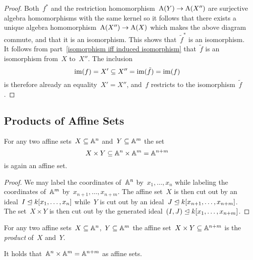 \begin{proof}
  Both~$f^*$ and the restriction homomorphism~$\operatorname{A}(Y) \to \operatorname{A}(X'')$ are surjective algebra homomorphisms with the same kernel so it follows that there exists a unique algebra homomorphism~$\operatorname{A}(X'') \to \operatorname{A}(X)$ which makes the above diagram commute, and that it is an isomorphism.
  This shows that~$\tilde{f}^*$ is an isomorphism.
  It follows from part~\ref*{isomorphism iff induced isomorphism} that~$\tilde{f}$ is an isomorphism from~$X$ to~$X''$.
  The inclusion
  \[
              \operatorname{im}(f)
    =         X'
    \subseteq X''
    =         \operatorname{im}(\tilde{f})
    =         \operatorname{im}(f)
  \]
  is therefore already an equality~$X' = X''$, and~$f$ restricts to the isomorphism~$\tilde{f}$.
\end{proof}





\subsection{Products of Affine Sets}


\begin{lemma}
  \label{product of affine sets is an affine set}
  For any two affine sets~$X \subseteq \mathbb{A}^n$ and~$Y \subseteq \mathbb{A}^m$ the set
  \[
              X \times Y
    \subseteq \mathbb{A}^n \times \mathbb{A}^m
    =         \mathbb{A}^{n+m}
  \]
  is again an affine set.
\end{lemma}


\begin{proof}
  We may label the coordinates of~$\mathbb{A}^n$ by~$x_1, \dotsc, x_n$ while labeling the coordinates of~$\mathbb{A}^m$ by~$x_{n+1}, \dotsc, x_{n+m}$.
  The affine set~$X$ is then cut out by an ideal~$I \trianglelefteq k[x_1, \dotsc, x_n]$ while~$Y$ is cut out by an ideal~$J \trianglelefteq k[x_{n+1}, \dotsc, x_{n+m}]$.
  The set~$X \times Y$ is then cut out by the generated ideal~$(I,J) \trianglelefteq k[x_1, \dotsc, x_{n+m}]$.
\end{proof}


\begin{definition}
  For any two affine sets~$X \subseteq \mathbb{A}^n$,~$Y \subseteq \mathbb{A}^m$ the affine set~$X \times Y \subseteq \mathbb{A}^{n+m}$ is the \emph{product} of~$X$ and~$Y$.
\end{definition}


\begin{example}
  It holds that~$\mathbb{A}^n \times \mathbb{A}^m = \mathbb{A}^{n+m}$ as affine sets.
\end{example}


